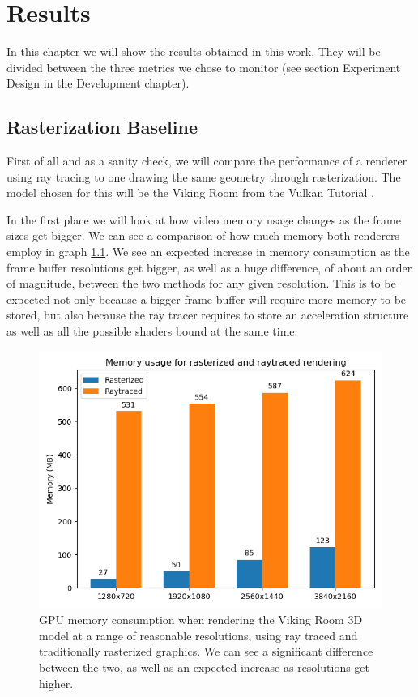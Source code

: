 \chapter{Results}

In this chapter we will show the results obtained in this work. They will be divided between the three metrics we chose to monitor (see section Experiment Design in the Development chapter).

\section{Rasterization Baseline}
First of all and as a sanity check, we will compare the performance of a renderer using ray tracing to one drawing the same geometry through rasterization. The model chosen for this will be the Viking Room from the Vulkan Tutorial \cite{VulkanTutorial}.

In the first place we will look at how video memory usage changes as the frame sizes get bigger. We can see a comparison of how much memory both renderers employ in graph \ref{memory-usage-comparison-graph}. We see an expected increase in memory consumption as the frame buffer resolutions get bigger, as well as a huge difference, of about an order of magnitude, between the two methods for any given resolution. This is to be expected not only because a bigger frame buffer will require more memory to be stored, but also because the ray tracer requires to store an acceleration structure as well as all the possible shaders bound at the same time.

\begin{figure}[hbt!]
    \centering
    \includegraphics[width=1.0\textwidth]{figuras/vulkan-memory-usage-comparison.png}
    \caption{GPU memory consumption when rendering the Viking Room 3D model at a range of reasonable resolutions, using ray traced and traditionally rasterized graphics. We can see a significant difference between the two, as well as an expected increase as resolutions get higher.}
    \label{memory-usage-comparison-graph}
\end{figure}

